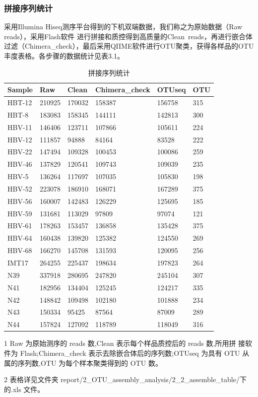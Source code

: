 \documentclass[a4paper,10pt]{article}
\numberwithin{figure}{section}
\numberwithin{table}{section}
\begin{document}
\subsubsection{拼接序列统计}
\label{Subsubsec:seqanalysis}
采用Illumina Hiseq测序平台得到的下机双端数据，我们称之为原始数据（Raw reads），采用Flash软件 \cite{Mago2011FLASH} 进行拼接和质控得到高质量的Clean\ reads，再进行嵌合体过滤（Chimera\_check），最后采用QIIME软件\cite{Caporaso2010QIIME}进行OTU聚类，获得各样品的OTU丰度表格。各步骤的数据统计见表3.1。
\begin{table}[H]
\begin{threeparttable}
\captionsetup{singlelinecheck = true}
 \caption{拼接序列统计}
 \label{table:seqanalysis}
 \footnotesize
 \begin{tabular}{p{}<{\centering} p{}<{\centering} p{}<{\centering} p{}<{\centering}p{}<{\centering}p{}<{\centering}}
 \toprule
 Sample&Raw&Clean&Chimera\_check&OTUseq&OTU\\
  \midrule
HBT-12&210925&170032&158387&156758&315\\
HBT-8&183083&158345&144111&142813&300\\
HBV-11&146406&123711&107866&105611&224\\
HBV-12&111857&94888&84164&83528&222\\
HBV-22&147494&109328&100453&100086&259\\
HBV-46&137829&120541&109743&109039&235\\
HBV-5&136264&117697&107035&105830&198\\
HBV-52&223078&186910&168071&167289&375\\
HBV-56&160007&142483&126229&125695&185\\
HBV-59&131681&113029&97809&97074&121\\
HBV-61&178263&153457&136858&135428&375\\
HBV-64&160438&139820&125382&124550&269\\
HBV-68&166270&145708&131593&120095&256\\
IMT17&264255&225437&198634&197823&264\\
N39&337918&280695&247820&245104&307\\
N41&182956&134404&125245&124217&335\\
N42&148842&109498&102180&101888&234\\
N43&150334&95425&87564&87009&289\\
N44&157824&127092&118789&118049&316\\
  \bottomrule
 \end{tabular}
 \begin{tablenotes}
 \footnotesize
\item[1] Raw 为原始测序的 reads 数,Clean 表示每个样品质控后的 reads 数,所用拼
接软件为 Flash;Chimera\_check 表示去除嵌合体后的序列数;OTUseq 为具有 OTU 从
属的序列数,OTU 为每个样本聚类得到的 OTU 数。
\item[2] 表格详见文件夹 report/2\_OTU\_assembly\_analysis/2\_2\_assemble\_table/下的.xls
文件。
\end{tablenotes}
\end{threeparttable}
\end{table}
\newpage
\end{document}
